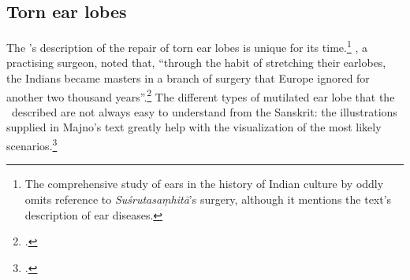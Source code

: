 %



\subsection{Torn ear lobes}

The \SS's description of the repair of torn ear lobes is  unique for its
time.\footnote{The comprehensive study of ears in the history of Indian culture by
    \citet{boll-2010} oddly omits reference to \emph{Suśrutasaṃhitā}'s surgery,
    although it mentions the text's description of ear diseases.}
    \citeauthor{majn-1975}, a practising surgeon, noted that, “through the habit of
    stretching their earlobes, the Indians became masters in a branch of surgery that
    Europe ignored for another two thousand years”.\footcite[291]{majn-1975} The
    different types of mutilated ear lobe that the \SS\ described are not always easy
    to understand from the Sanskrit: the illustrations supplied in Majno's text
    greatly help with the visualization of the most likely
    scenarios.\footcites[290--291]{majn-1975}[reproduced with permission
    in][92--93]{wuja-2003}

